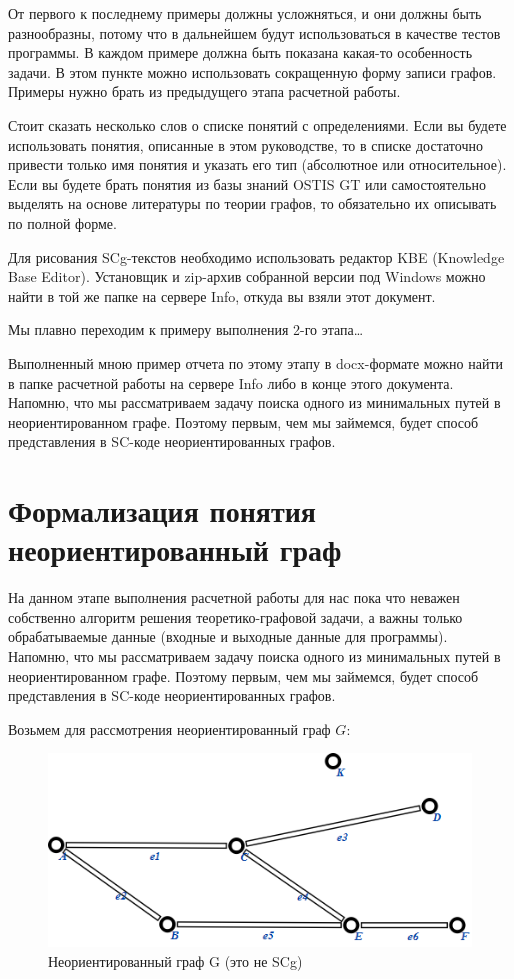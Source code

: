 От первого к последнему примеры должны усложняться, и они должны быть
разнообразны, потому что в дальнейшем будут использоваться в качестве
тестов программы. В каждом примере должна быть показана какая-то
особенность задачи. В этом пункте можно использовать сокращенную форму
записи графов. Примеры нужно брать из предыдущего этапа расчетной
работы.

Стоит сказать несколько слов о списке понятий с определениями. Если вы
будете использовать понятия, описанные в этом руководстве, то в списке
достаточно привести только имя понятия и указать его тип (абсолютное
или относительное). Если вы будете брать понятия из базы знаний OSTIS
GT или самостоятельно выделять на основе литературы по теории графов,
то обязательно их описывать по полной форме.

Для рисования SCg-текстов необходимо использовать редактор KBE
(Knowledge Base Editor). Установщик и zip-архив собранной версии под
Windows можно найти в той же папке на сервере Info, откуда вы взяли
этот документ.

Мы плавно переходим к примеру выполнения 2-го этапа…

Выполненный мною пример отчета по этому этапу в docx-формате можно
найти в папке расчетной работы на сервере Info либо в конце этого
документа.  Напомню, что мы рассматриваем задачу поиска одного из
минимальных путей в неориентированном графе. Поэтому первым, чем мы
займемся, будет способ представления в SC-коде неориентированных
графов.


\section{Формализация понятия неориентированный граф}

На данном этапе выполнения расчетной работы для нас пока что неважен
собственно алгоритм решения теоретико-графовой задачи, а важны только
обрабатываемые данные (входные и выходные данные для
программы). Напомню, что мы рассматриваем задачу поиска одного из
минимальных путей в неориентированном графе. Поэтому первым, чем мы
займемся, будет способ представления в SC-коде неориентированных
графов.

Возьмем для рассмотрения неориентированный граф $G$:

\begin{figure}[h]
  \centering
  \includegraphics[scale=0.7]{images/2/Undirected_graph_not_scg}
  \caption{Неориентированный граф G (это не SCg)}
  \label{fig:Undirected_graph_not_scg}
\end{figure}

